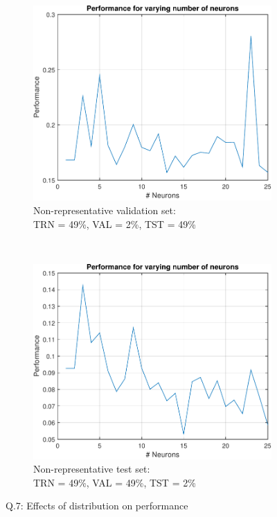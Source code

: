 \documentclass[12pt, a4paper]{article}
\begin{document}
\begin{figure}[htbp]
\begin{subfigure}[b]{0.48\textwidth}
			\label{Q7-non-repr-train}
		\end{subfigure}
		\\
		\begin{subfigure}[b]{0.48\textwidth}
			\includegraphics[width=\textwidth]{Q7-non-representative-validation}
			\caption{Non-representative validation set:\\ TRN = 49\%, VAL = 2\%, TST = 49\%}
			\label{Q7-non-repr-validation}
		\end{subfigure}
		~
		\begin{subfigure}[b]{0.48\textwidth}
			\includegraphics[width=\textwidth]{Q7-non-representative-test}
			\caption{Non-representative test set:\\ TRN = 49\%, VAL = 49\%, TST = 2\%}
			\label{Q7-non-repr-test}
		\end{subfigure}

\caption{Q.7: Effects of distribution on performance}
\label{Q7}
\end{figure}
\end{document}
